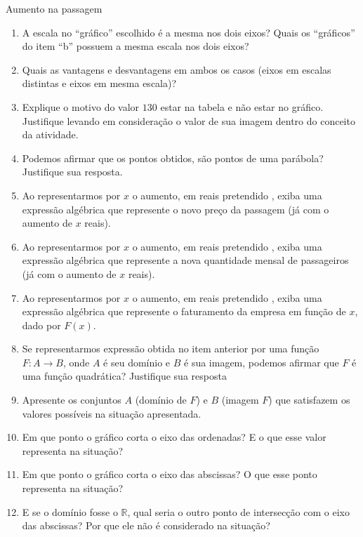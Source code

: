 \begin{task}{Aumento na passagem}
\begin{enumerate}
\item {} 
A escala no “gráfico” escolhido é a mesma nos dois eixos? Quais os “gráficos” do item “b” possuem a mesma escala nos dois eixos?

\item {} 
Quais as vantagens e desvantagens em ambos os casos (eixos em escalas distintas e eixos em mesma escala)?

\item {} 
Explique o motivo do valor \(130\) estar na tabela e não estar no gráfico. Justifique levando em consideração o valor de sua imagem dentro do conceito da atividade.

\item {} 
Podemos afirmar que os pontos obtidos, são pontos de uma parábola? Justifique sua resposta.

\item {} 
Ao representarmos por \(x\) o aumento, em reais pretendido , exiba uma expressão algébrica que represente o novo preço da passagem (já com o aumento de \(x\) reais).

\item {} 
Ao representarmos por \(x\) o aumento, em reais pretendido , exiba uma expressão algébrica que represente a nova quantidade mensal de passageiros (já com o aumento de \(x\) reais).

\item {} 
Ao representarmos por \(x\) o aumento, em reais pretendido , exiba uma expressão algébrica que represente o faturamento da empresa em função de \(x\), dado por \(F(x)\).

\item {} 
Se representarmos expressão obtida no item anterior por uma função \(F:A\to B\), onde \(A\) é seu domínio e \(B\) é sua imagem, podemos afirmar que \(F\) é uma função quadrática? Justifique sua resposta

\item {} 
Apresente os conjuntos \(A\) (domínio de \(F\)) e \(B\) (imagem \(F\)) que satisfazem os valores possíveis na situação apresentada.

\item {} 
Em que ponto o gráfico corta o eixo das ordenadas? E o que esse valor representa na situação?

\item {} 
Em que ponto o gráfico corta o eixo das abscissas? O que esse ponto representa na situação?

\item {} 
E se o domínio fosse o \(\mathbb{R}\), qual seria o outro ponto de intersecção com o eixo das abscissas? Por que ele não é considerado na situação?


\end{enumerate}
\end{task}
